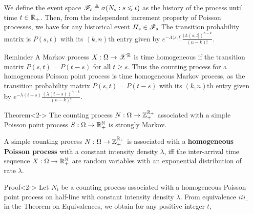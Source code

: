 \documentclass[12pt,aspectratio=169]{beamer}
\begin{document}
\begin{frame}
\begin{Proof} 
We define the event space $\mathscr{F}_t \triangleq \sigma(N_s: s \leqslant t)$ as the history of the process until time $t \in \mathbb{R}_+$. 
Then, from the independent increment property of Poisson processes, we have for any historical event $H_s \in \mathscr{F}_s$ 
The transition probability matrix is $P(s,t)$ with its $(k,n)$th entry given by $e^{-\Lambda(s,t]}\frac{(\Lambda(s,t])^{n-k}}{(n-k)!}$. 
\end{Proof}
\end{frame}


\begin{frame}
\begin{block}{Reminder}
A Markov process $X:\Omega\to\mathscr{X}^{\mathbb{R}}$ is time homogeneous if the transition matrix $P(s,t) = P(t-s)$ for all $t \ge s$. 
Thus the counting process for a homogeneous Poisson point process is time homogeneous Markov process, as the transition probability matrix $P(s,t) = P(t-s)$ with its $(k,n)$th entry given by $e^{-\lambda(t-s)}\frac{(\lambda(t-s))^{n-k}}{(n-k)!}$. 
\end{block}
\begin{block}{Theorem}<2->
The counting process $N:\Omega\to\mathbb{Z}_+^{\mathbb{R}_+}$ 
associated with a simple Poisson point process $S:\Omega\to\mathbb{R}_+^{\mathbb{N}}$ 
is strongly Markov. 
\end{block}
\end{frame}


\begin{frame}
\begin{prop}
A simple counting process $N:\Omega\to\mathbb{Z}_+^{\mathbb{R}_+}$ is associated with a \textbf{homogeneous Poisson process} with a constant intensity density $\lambda$, 
iff the inter-arrival time sequence $X:\Omega\to\mathbb{R}_+^{\mathbb{N}}$ are \iid random variables with an exponential distribution of rate $\lambda$. 
\end{prop}
\begin{block}{Proof}<2->
Let $N_t$ be a counting process associated with a homogeneous Poisson point process on half-line with constant intensity density $\lambda$. 
From equivalence $iii\_$ in the Theorem on Equivalences, we obtain for any positive integer $t$, 
\end{block}
\end{frame}
\end{document}
